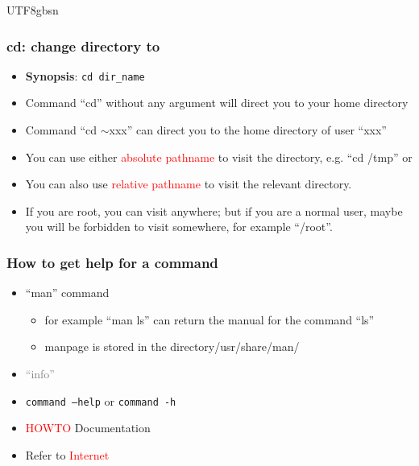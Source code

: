 \documentclass[red]{beamer}
\begin{document}
\begin{CJK*}{UTF8}{gbsn}
\begin{frame}
\frametitle{cd: change directory to}
\begin{itemize}
    \item \textbf{Synopsis}: \texttt{cd dir\_name}
    \item Command ``cd'' without any argument will direct you to your home directory
    \item Command ``cd $\sim$xxx'' can direct you to the home directory of user ``xxx''
    \item You can use either \textcolor{red}{absolute pathname} to visit the directory, e.g. ``cd /tmp'' or
    \item You can also use \textcolor{red}{relative pathname} to visit the relevant directory.
    \item If you are root, you can visit anywhere; but if you are a normal user, maybe you will be
        forbidden to visit somewhere, for example ``/root''.
\end{itemize}
\end{frame}

\begin{frame}
\frametitle{How to get help for a command}
\begin{itemize}
    \item ``man'' command
    \begin{itemize}
        \item for example ``man ls'' can return the manual for the command ``ls''
        \item manpage is stored in the directory/usr/share/man/
    \end{itemize}
    \item \textcolor{gray}{``info''}
    \item \texttt{command --help} or \texttt{command -h}
    \item \textcolor{red}{HOWTO} Documentation
    \item Refer to \textcolor{red}{Internet}
\end{itemize}
\end{frame}


\end{CJK*}
\end{document}
